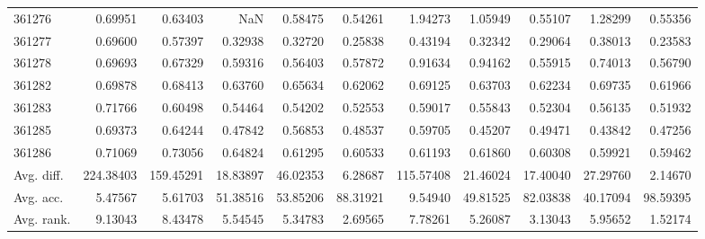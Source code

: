 \begin{tabular}{lrrrrrrrrrr}
361276 & 0.69951 & 0.63403 & NaN & 0.58475 & 0.54261 & 1.94273 & 1.05949 & 0.55107 & 1.28299 & 0.55356 \\
361277 & 0.69600 & 0.57397 & 0.32938 & 0.32720 & 0.25838 & 0.43194 & 0.32342 & 0.29064 & 0.38013 & 0.23583 \\
361278 & 0.69693 & 0.67329 & 0.59316 & 0.56403 & 0.57872 & 0.91634 & 0.94162 & 0.55915 & 0.74013 & 0.56790 \\
361282 & 0.69878 & 0.68413 & 0.63760 & 0.65634 & 0.62062 & 0.69125 & 0.63703 & 0.62234 & 0.69735 & 0.61966 \\
361283 & 0.71766 & 0.60498 & 0.54464 & 0.54202 & 0.52553 & 0.59017 & 0.55843 & 0.52304 & 0.56135 & 0.51932 \\
361285 & 0.69373 & 0.64244 & 0.47842 & 0.56853 & 0.48537 & 0.59705 & 0.45207 & 0.49471 & 0.43842 & 0.47256 \\
361286 & 0.71069 & 0.73056 & 0.64824 & 0.61295 & 0.60533 & 0.61193 & 0.61860 & 0.60308 & 0.59921 & 0.59462 \\
Avg. diff. & 224.38403 & 159.45291 & 18.83897 & 46.02353 & 6.28687 & 115.57408 & 21.46024 & 17.40040 & 27.29760 & 2.14670 \\
Avg. acc. & 5.47567 & 5.61703 & 51.38516 & 53.85206 & 88.31921 & 9.54940 & 49.81525 & 82.03838 & 40.17094 & 98.59395 \\
Avg. rank. & 9.13043 & 8.43478 & 5.54545 & 5.34783 & 2.69565 & 7.78261 & 5.26087 & 3.13043 & 5.95652 & 1.52174 \\
\bottomrule
\end{tabular}
